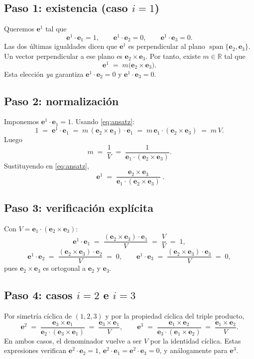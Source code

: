\documentclass[12pt]{article}
\begin{document}
\subsection*{Paso 1: existencia (caso $i=1$)}
Queremos $\mathbf e^1$ tal que
\[
\mathbf e^1\cdot \mathbf e_1=1,\qquad 
\mathbf e^1\cdot \mathbf e_2=0,\qquad 
\mathbf e^1\cdot \mathbf e_3=0.
\]
Las dos últimas igualdades dicen que $\mathbf e^1$ es perpendicular al plano $\operatorname{span}\{\mathbf e_2,\mathbf e_3\}$. 
Un vector perpendicular a ese plano es $\mathbf e_2\times \mathbf e_3$. 
Por tanto, existe $m\in\mathbb R$ tal que
\begin{equation}\label{eq:ansatz}
\mathbf e^1 \;=\; m\bigl(\mathbf e_2\times \mathbf e_3\bigr).
\end{equation}
Esta elección \emph{ya} garantiza $\mathbf e^1\cdot \mathbf e_2=0$ y $\mathbf e^1\cdot \mathbf e_3=0$.

\subsection*{Paso 2: normalización}
Imponemos $\mathbf e^1\cdot \mathbf e_1=1$. Usando \eqref{eq:ansatz}:
\[
1 \;=\; \mathbf e^1\cdot \mathbf e_1 
\;=\; m\,(\mathbf e_2\times \mathbf e_3)\cdot \mathbf e_1
\;=\; m\,\mathbf e_1\cdot(\mathbf e_2\times \mathbf e_3)
\;=\; m\,V.
\]
Luego 
\[
m \;=\; \frac{1}{V}\;=\;\frac{1}{\mathbf e_1\cdot(\mathbf e_2\times \mathbf e_3)}.
\]
Sustituyendo en \eqref{eq:ansatz},
\[
\boxed{\;\mathbf e^1 \;=\; \frac{\mathbf e_2\times \mathbf e_3}{\mathbf e_1\cdot(\mathbf e_2\times \mathbf e_3)}\;}.
\]

\subsection*{Paso 3: verificación explícita}
Con $V=\mathbf e_1\cdot(\mathbf e_2\times \mathbf e_3)$:
\[
\mathbf e^1\cdot \mathbf e_1 \;=\; \frac{(\mathbf e_2\times \mathbf e_3)\cdot \mathbf e_1}{V} \;=\; \frac{V}{V}\;=\;1,
\]
\[
\mathbf e^1\cdot \mathbf e_2 \;=\; \frac{(\mathbf e_2\times \mathbf e_3)\cdot \mathbf e_2}{V} \;=\; 0,\qquad
\mathbf e^1\cdot \mathbf e_3 \;=\; \frac{(\mathbf e_2\times \mathbf e_3)\cdot \mathbf e_3}{V} \;=\; 0,
\]
pues $\mathbf e_2\times \mathbf e_3$ es ortogonal a $\mathbf e_2$ y $\mathbf e_3$.

\subsection*{Paso 4: casos $i=2$ e $i=3$}
Por simetría cíclica de $(1,2,3)$ y por la propiedad cíclica del triple producto,
\[
\mathbf e^2 \;=\; \frac{\mathbf e_3\times \mathbf e_1}{\mathbf e_2\cdot(\mathbf e_3\times \mathbf e_1)}
\;=\;\frac{\mathbf e_3\times \mathbf e_1}{V},\qquad
\mathbf e^3 \;=\; \frac{\mathbf e_1\times \mathbf e_2}{\mathbf e_3\cdot(\mathbf e_1\times \mathbf e_2)}
\;=\;\frac{\mathbf e_1\times \mathbf e_2}{V}.
\]
En ambos casos, el denominador vuelve a ser $V$ por la identidad cíclica. 
Estas expresiones verifican 
$\mathbf e^2\cdot \mathbf e_2=1$, $\mathbf e^2\cdot \mathbf e_1=\mathbf e^2\cdot \mathbf e_3=0$, 
y análogamente para $\mathbf e^3$.
\end{document}
